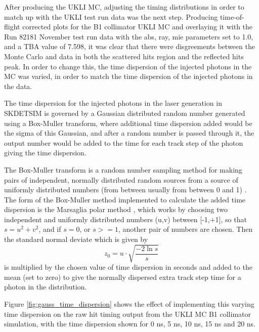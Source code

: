 






After producing the UKLI MC, adjusting the timing distributions in order to match up with the UKLI test run data was the next step. Producing time-of-flight corrected plots for the B1 collimator UKLI MC and overlaying it with the Run 82181 November test run data with the abs, ray, mie parameters set to 1.0, and a TBA value of 7.598, it was clear that there were disgreements between the Monte Carlo and data in both the scattered hits region and the reflected hits peak. In order to change this, the time dispersion of the injected photons in the MC was varied, in order to match the time dispersion of the injected photons in the data.

The time dispersion for the injected photons in the laser generation in SKDETSIM is governed by a Gaussian distributed random number generated using a Box-Muller transform, where additional time dispersion added would be the sigma of this Gaussian, and after a random number is passed through it, the output number would be added to the time for each track step of the photon giving the time dispersion.

The Box-Muller transform is a random number sampling method for making pairs of independent, normally distributed random sources from a source of uniformly distributed numbers (from between usually from between 0 and 1) \cite{10.1214/aoms/1177706645}. The form of the Box-Muller method implemented to calculate the added time dispersion is the Marsaglia polar method \cite{doi:10.1137/1006063}, which works by choosing two independent and uniformly distributed numbers (u,v) between [-1,+1], so that $s = u^{2} + v^{2}$, and if $s=0$, or $s>=1$, another pair of numbers are chosen. Then the standard normal deviate which is given by $$z_{0}=u \cdot \sqrt{\frac{-2 \ln s}{s}}$$ is multiplied by the chosen value of time dispersion in seconds and added to the mean (set to zero) to give the normally dispersed extra track step time for a photon in the distribution. 

Figure \ref{fig:gauss_time_dispersion} shows the effect of implementing this varying time dispersion on the raw hit timing output from the UKLI MC B1 collimator simulation, with the time dispersion shown for 0 ns, 5 ns, 10 ns, 15 ns and 20 ns. 

